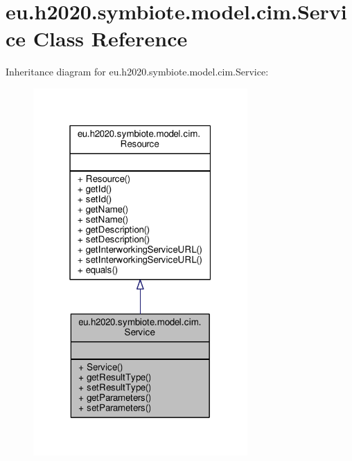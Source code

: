 \hypertarget{classeu_1_1h2020_1_1symbiote_1_1model_1_1cim_1_1Service}{}\section{eu.\+h2020.\+symbiote.\+model.\+cim.\+Service Class Reference}
\label{classeu_1_1h2020_1_1symbiote_1_1model_1_1cim_1_1Service}


Inheritance diagram for eu.\+h2020.\+symbiote.\+model.\+cim.\+Service\+:
\nopagebreak
\begin{figure}[H]
\begin{center}
\leavevmode
\includegraphics[width=232pt]{classeu_1_1h2020_1_1symbiote_1_1model_1_1cim_1_1Service__inherit__graph}
\end{center}
\end{figure}



